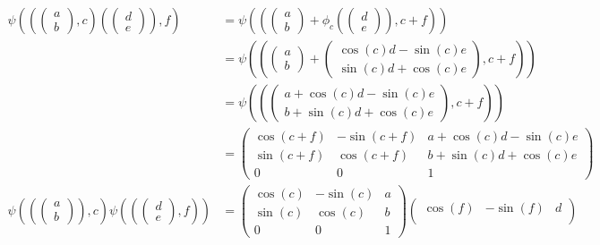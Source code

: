\documentclass[11pt]{article}
\begin{document}
		\begin{align*}
			\psi((\begin{pmatrix}
				a\\b
				\end{pmatrix}, c)(\begin{pmatrix}
				d\\e
				\end{pmatrix}), f) &= \psi((\begin{pmatrix} 
					a\\b
				\end{pmatrix} + \phi_c(\begin{pmatrix} d\\e \end{pmatrix}), c+f))\\ 
					&= \psi((\begin{pmatrix}
						a\\b 
					\end{pmatrix} + \begin{pmatrix}
						\cos(c)d - \sin(c)e\\
						\sin(c)d + \cos(c)e
					\end{pmatrix}, c+f))\\
					&= \psi((\begin{pmatrix}
						a + \cos(c)d - \sin(c)e\\
						b + \sin(c)d + \cos(c)e
					\end{pmatrix}, c+f))\\
					&= \begin{pmatrix}
						\cos(c+f) & -\sin(c+f) & a + \cos(c)d - \sin(c)e\\
						\sin(c+f) & \cos(c+f) & b + \sin(c)d + \cos(c)e\\
						0 & 0 & 1
					\end{pmatrix}\\
			\psi((\begin{pmatrix}
				a\\b \end{pmatrix}), c) \psi((\begin{pmatrix}
				d\\e
				\end{pmatrix}, f)) &= \begin{pmatrix}
					\cos(c) & -\sin(c) & a\\
					\sin(c) & \cos(c) & b\\
					0 & 0 & 1
				\end{pmatrix}\begin{pmatrix}
					\cos(f) & -\sin(f) & d\\

\end{pmatrix}
\end{align*}
\end{document}
